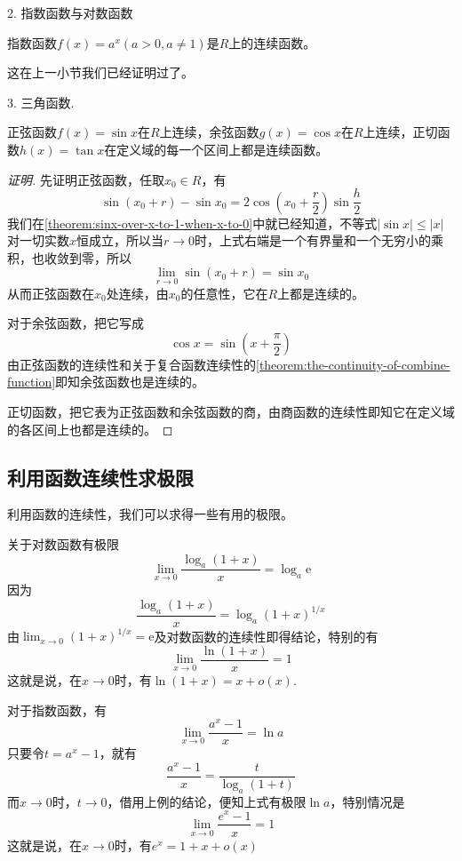 2. 指数函数与对数函数
\begin{theorem}
  指数函数$f(x)=a^x(a>0,a\neq 1)$是$R$上的连续函数。
\end{theorem}

这在上一小节我们已经证明过了。

3. 三角函数.
\begin{theorem}
  正弦函数$f(x)=\sin{x}$在$R$上连续，余弦函数$g(x)=\cos{x}$在$R$上连续，正切函数$h(x)=\tan{x}$在定义域的每一个区间上都是连续函数。
\end{theorem}

\begin{proof}[证明]
  先证明正弦函数，任取$x_0 \in R$，有
  \[ \sin{(x_0+r)} - \sin{x_0} = 2\cos{ \left( x_0 + \frac{r}{2} \right) }\sin{ \frac{h}{2} } \]
  我们在\autoref{theorem:sinx-over-x-to-1-when-x-to-0}中就已经知道，不等式$|\sin{x}| \leqslant |x|$对一切实数$x$恒成立，所以当$r \to 0$时，上式右端是一个有界量和一个无穷小的乘积，也收敛到零，所以
  \[ \lim_{r \to 0} \sin{(x_0+r)} = \sin{x_0} \]
  从而正弦函数在$x_0$处连续，由$x_0$的任意性，它在$R$上都是连续的。

  对于余弦函数，把它写成
  \[ \cos{x} = \sin{ \left( x+\frac{\pi}{2} \right) } \]
  由正弦函数的连续性和关于复合函数连续性的\autoref{theorem:the-continuity-of-combine-function}即知余弦函数也是连续的。

  正切函数，把它表为正弦函数和余弦函数的商，由商函数的连续性即知它在定义域的各区间上也都是连续的。
\end{proof}


\subsection{利用函数连续性求极限}
\label{sec:find-limit-by-continuousness}

利用函数的连续性，我们可以求得一些有用的极限。

\begin{example}
  \label{example:ln-1+x-equaliant-to-x}
  关于对数函数有极限
  \[ \lim_{x \to 0} \frac{\log_a(1+x)}{x} = \log_a \mathrm{e} \]
  因为
  \[ \frac{\log_a(1+x)}{x} = \log_a (1+x)^{1/x} \]
  由$\lim_{x \to 0} (1+x)^{1/x} = \mathrm{e}$及对数函数的连续性即得结论，特别的有
  \[ \lim_{x \to 0} \frac{\ln(1+x)}{x} = 1 \]
  这就是说，在$x \to 0$时，有$\ln(1+x)=x+o(x)$.
\end{example}

\begin{example}
  \label{example:e-power-x-1-equalitant-to-x}
  对于指数函数，有
  \[ \lim_{x \to 0} \frac{a^x-1}{x} = \ln{a} \]
  只要令$t=a^x-1$，就有
  \[ \frac{a^x-1}{x} = \frac{t}{\log_a(1+t)} \]
  而$x \to 0$时，$t \to 0$，借用上例的结论，便知上式有极限$\ln{a}$，特别情况是
  \[ \lim_{x \to 0} \frac{e^x-1}{x} = 1 \]
  这就是说，在$x \to 0$时，有$e^x=1+x+o(x)$
\end{example}

